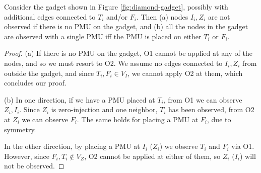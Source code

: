 \begin{lemma}\label{lem:property1}
Consider the gadget shown in Figure \ref{fig:diamond-gadget}, possibly with additional edges connected to $T_i$ and/or $F_i$. Then (a) nodes $I_i, Z_i$ are not observed if there is no PMU on the gadget, and (b) all the nodes in the gadget are observed with a single PMU iff the PMU is placed on either $T_i$ or $F_i$.
\end{lemma}
\begin{proof}
(a) If there is no PMU on the gadget, O1 cannot be applied at any of the nodes, and so we must resort to O2. We assume no edges connected to $I_i,Z_i$ from outside the gadget, and since $T_i,F_i\in V_I$, we cannot apply O2 at them, which concludes our proof.
 
(b) In one direction, if we have a PMU placed at $T_i$, from O1 we can observe $Z_i,I_i$. Since $Z_i$ is zero-injection and one neighbor, $T_i$ has been observed, from O2 at $Z_i$ we can observe $F_i$. The same holds for placing a PMU at $F_i$, due to symmetry.

In the other direction, by placing a PMU at $I_i$ ($Z_i$) we observe $T_i$ and $F_i$ via O1. However, since $F_i,T_i\notin V_Z$, O2 cannot be applied at either of them, so $Z_i$ ($I_i$) will not be observed. 
\end{proof}

